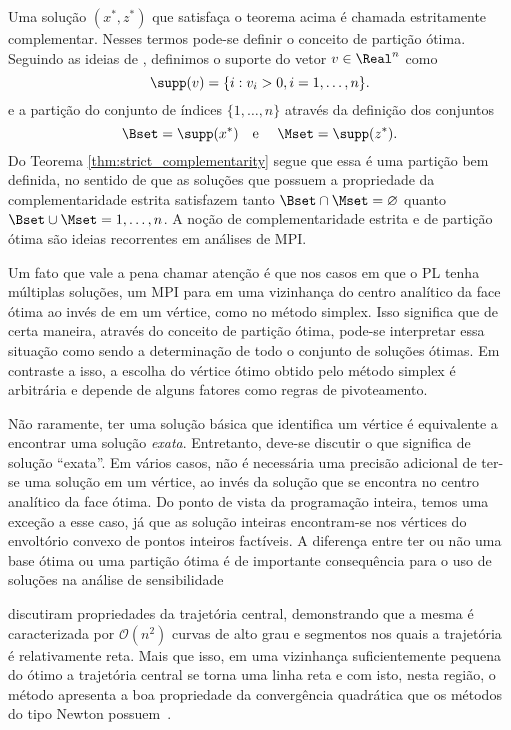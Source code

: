  

Uma solução $(x^*,z^*)$ que satisfaça o teorema acima é chamada estritamente
complementar. Nesses termos pode-se definir o conceito de partição ótima.
Seguindo as ideias de \citet{Jansen:1997vy}, definimos o suporte do vetor
$v\in\Real^n$ como
\[
\supp(v) = \{i:v_i>0, i=1,\ldots,n\}.
\]
e a partição do conjunto de índices $\{1,\ldots,n\}$ através da definição dos
conjuntos 
\[
\Bset = \supp(x^*) \text{\quad e \quad } \Mset = \supp(z^*).
\]
Do Teorema \ref{thm:strict_complementarity} segue que essa é uma partição bem
definida, no sentido de que as soluções que possuem a propriedade da
complementaridade estrita satisfazem tanto $\Bset\cap \Mset = \varnothing$
quanto $\Bset\cup\Mset = {1,\ldots,n}$. A noção de complementaridade estrita e
de partição ótima são ideias recorrentes em análises de \ac{MPI}.

Um  fato que vale a pena chamar atenção é que nos casos em que o \ac{PL}
tenha múltiplas soluções, um \ac{MPI} para em uma vizinhança do 
centro analítico da face ótima ao invés de em um vértice, como no método
simplex. Isso significa que de certa maneira, através do conceito de partição
ótima,  pode-se interpretar essa situação como sendo a determinação de
todo o conjunto de soluções ótimas. Em contraste a isso, a escolha do vértice ótimo obtido pelo
método simplex é arbitrária e depende de alguns fatores como regras de
pivoteamento. 

Não raramente, ter uma solução básica que identifica um vértice é equivalente a
encontrar uma solução \emph{exata}. Entretanto, deve-se discutir o que significa de
solução ``exata''. Em vários casos, não é necessária uma precisão adicional de
ter-se uma solução em um vértice, ao invés da solução que se encontra no centro
analítico da face ótima.  Do ponto de vista da programação inteira, temos uma
exceção a esse caso, já que as solução inteiras encontram-se nos vértices do
envoltório convexo de pontos inteiros factíveis. A diferença entre ter ou não
uma base ótima ou uma partição ótima é de importante consequência para o uso de
soluções na análise de sensibilidade \cite{Jansen:1997vy,Yildirim:2001gp}


\citet{Vavasis:1996bw}
discutiram propriedades da trajetória central, demonstrando que a mesma é caracterizada por
$\mathcal{O}(n^2)$ curvas de alto grau e segmentos nos quais a trajetória é
relativamente reta. Mais que isso, em uma vizinhança
suficientemente pequena do ótimo a trajetória central se torna uma linha reta
e com isto, nesta região, o método apresenta a boa propriedade da convergência quadrática que os métodos do tipo
Newton possuem~\cite{Meggido:Pathways-to-the-optimal:1988u}.
 


